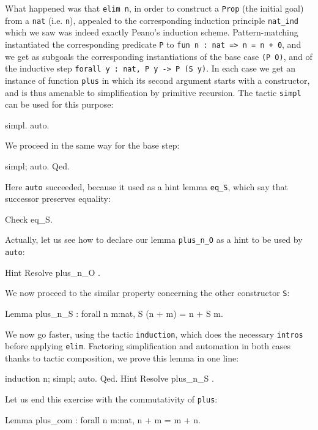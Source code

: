 \documentclass[11pt,a4paper]{book}
\begin{document}
What happened was that \texttt{elim n}, in order to construct a \texttt{Prop}
(the initial goal) from a \texttt{nat} (i.e. \texttt{n}), appealed to the
corresponding induction principle \texttt{nat\_ind} which we saw was indeed
exactly Peano's induction scheme. Pattern-matching instantiated the 
corresponding predicate \texttt{P} to \texttt{fun n : nat => n = n + 0},
and we get as subgoals the corresponding instantiations of the base case
\texttt{(P O)}, and of the inductive step
\texttt{forall y : nat, P y -> P (S y)}.
In each case we get an instance of function \texttt{plus} in which its second
argument starts with a constructor, and is thus amenable to simplification
by primitive recursion. The \Coq{} tactic \texttt{simpl} can be used for
this purpose:
\begin{coq_example}
simpl.
auto.
\end{coq_example}

We proceed in the same way for the base step:
\begin{coq_example}
simpl; auto.
Qed.
\end{coq_example}

Here \verb:auto: succeeded, because it used as a hint lemma \verb:eq_S:,
which say that successor preserves equality:
\begin{coq_example}
Check eq_S.
\end{coq_example}

Actually, let us see how to declare our lemma \verb:plus_n_O: as a hint
to be used by \verb:auto::
\begin{coq_example}
Hint Resolve plus_n_O .
\end{coq_example}

We now proceed to the similar property concerning the other constructor
\verb:S::
\begin{coq_example}
Lemma plus_n_S : forall n m:nat, S (n + m) = n + S m.
\end{coq_example}

We now go faster, using the tactic \verb:induction:, which does the
necessary \verb:intros: before applying \verb:elim:. Factoring simplification
and automation in both cases thanks to tactic composition, we prove this
lemma in one line:
\begin{coq_example}
induction n; simpl; auto.
Qed.
Hint Resolve plus_n_S .
\end{coq_example}

Let us end this exercise with the commutativity of \verb:plus::

\begin{coq_example}
Lemma plus_com : forall n m:nat, n + m = m + n.
\end{coq_example}
\end{document}
